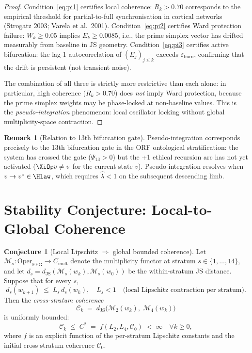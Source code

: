 \documentclass[12pt,a4paper]{article}
\theoremstyle{plain}
\theoremstyle{definition}
\newtheorem{remark}[theorem]{Remark}
\newtheorem{conjecture}[theorem]{Conjecture}
\newcommand{\dJS}{d_{\mathrm{JS}}}
\renewcommand{\Psi}{\varPsi}
\begin{document}
\begin{proof}
  Condition~\eqref{eq:pi1} certifies local coherence: $R_k > 0.70$
  corresponds to the empirical threshold for partial-to-full
  synchronisation in cortical networks (Strogatz 2003; Varela et al.\ 2001).
  Condition~\eqref{eq:pi2} certifies Ward protection failure:
  $W_k \ge 0.05$ implies $E_k \ge 0.0085$, i.e., the prime simplex vector
  has drifted measurably from baseline in JS geometry.
  Condition~\eqref{eq:pi3} certifies active bifurcation: the lag-1
  autocorrelation of $(E_j)_{j\le k}$ exceeds $\varepsilon_{\mathrm{burn}}$,
  confirming that the drift is persistent (not transient noise).

  The combination of all three is strictly more restrictive than each
  alone: in particular, high coherence ($R_k > 0.70$) does \emph{not}
  imply Ward protection, because the prime simplex weights may be
  phase-locked at non-baseline values.  This is the
  \emph{pseudo-integration} phenomenon: local oscillator locking without
  global multiplicity-space contraction.
\end{proof}

\begin{remark}[Relation to 13th bifurcation gate]
  Pseudo-integration corresponds precisely to the 13th bifurcation gate
  in the ORF ontological stratification: the system has crossed the gate
  ($\Psi_{13}>0$) but the +1 ethical recursion arc has not yet activated
  ($\XiOp v \ne v$ for the current state $v$).  Pseudo-integration resolves
  when $v\to v^*\in\Hlaw$, which requires $\hat\lambda < 1$ on the
  subsequent descending limb.
\end{remark}

\section{Stability Conjecture: Local-to-Global Coherence}
\label{sec:conjecture}

\begin{conjecture}[Local Lipschitz $\Rightarrow$ global bounded coherence]
  \label{conj:main}
  Let $\mathcal{M}_s : \mathrm{Oper}_{\mathrm{EEG}} \to C_{\mathrm{mult}}$
  denote the multiplicity functor at stratum $s\in\{1,\ldots,14\}$, and
  let $d_s = \dJS(\mathcal{M}_s(w_k), \mathcal{M}_s(w_0))$ be the
  within-stratum JS distance.  Suppose that for every $s$,
  \[
    d_s(w_{k+1}) \;\le\; L_s\, d_s(w_k),\quad L_s < 1
    \quad\text{(local Lipschitz contraction per stratum)}.
  \]
  Then the \emph{cross-stratum coherence}
  \[
    \mathcal{C}_k \;=\; \dJS\!\bigl(\mathcal{M}_2(w_k),\;\mathcal{M}_4(w_k)\bigr)
  \]
  is uniformly bounded:
  \[
    \mathcal{C}_k \;\le\; C^* \;=\; f(L_2, L_4, \mathcal{C}_0) \;<\; \infty
    \quad\forall k\ge 0,
  \]
  where $f$ is an explicit function of the per-stratum Lipschitz constants
  and the initial cross-stratum coherence $\mathcal{C}_0$.
\end{conjecture}
\end{document}
